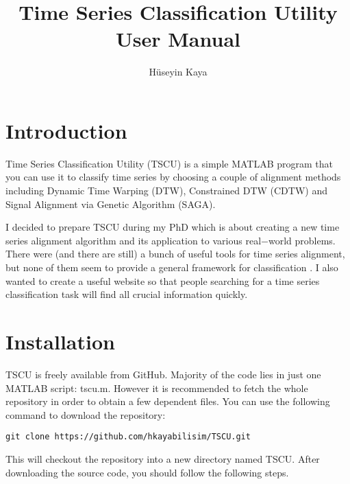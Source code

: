 \documentclass{article}
\title{Time Series Classification Utility\\ User Manual}
\author{Hüseyin Kaya}
\begin{document}
\maketitle%
\tableofcontents%

\section{Introduction}
Time Series Classification Utility (TSCU) is a simple MATLAB program that you can use it to classify time series by choosing a couple of alignment methods including Dynamic Time Warping (DTW), Constrained DTW (CDTW) and Signal Alignment via Genetic Algorithm (SAGA).

I decided to prepare TSCU during my PhD which is about creating a new time series alignment algorithm and its application to various real$-$world problems. There were (and there are still) a bunch of useful tools for time series alignment, but none of them seem to provide a general framework for classification \cite{UCRWeb}. I also wanted to create a useful website so that people searching for a time series classification task will find all crucial information quickly.
\section{Installation}
TSCU is freely available from GitHub. Majority of the code lies in just one MATLAB script: tscu.m. However it is recommended to fetch the whole repository in order to obtain a few dependent files. You can use the following command to download the repository:
\begin{verbatim}
git clone https://github.com/hkayabilisim/TSCU.git
\end{verbatim}
This will checkout the repository into a new directory named TSCU.\@
After downloading the source code, you should follow the following steps.
\end{document}
